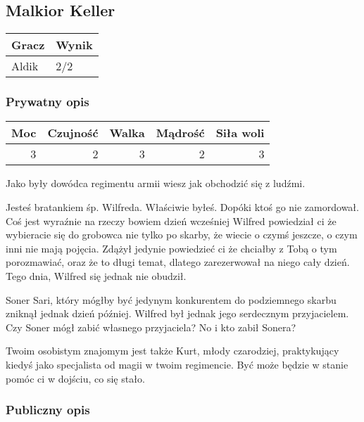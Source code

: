 \documentclass[11pt]{article}
\begin{document}
\subsection*{Malkior Keller}
\label{sec-3.2}


\begin{center}
\begin{tabular}{ll}
 Gracz  &  Wynik  \\
\hline
 Aldik  &  2/2    \\
\end{tabular}
\end{center}


\subsubsection*{Prywatny opis}
\label{sec-3.2.1}


\begin{center}
\begin{tabular}{rrrrr}
 Moc  &  Czujność  &  Walka  &  Mądrość  &  Siła woli  \\
\hline
   3  &         2  &      3  &        2  &          3  \\
\end{tabular}
\end{center}


    Jako były dowódca regimentu armii wiesz jak obchodzić się z
    ludźmi.
    
    Jesteś bratankiem śp. Wilfreda. Właściwie byłeś. Dopóki ktoś go
    nie zamordował. Coś jest wyraźnie na rzeczy bowiem dzień
    wcześniej Wilfred powiedział ci że wybieracie się do grobowca nie
    tylko po skarby, że wiecie o czymś jeszcze, o czym inni nie mają
    pojęcia. Zdążył jedynie powiedzieć ci że chciałby z Tobą o tym
    porozmawiać, oraz że to długi temat, dlatego zarezerwował na
    niego cały dzień. Tego dnia, Wilfred się jednak nie obudził.

    Soner Sari, który mógłby być jedynym konkurentem do podziemnego
    skarbu zniknął jednak dzień później. Wilfred był jednak
    jego serdecznym przyjacielem. Czy Soner mógł zabić własnego
    przyjaciela? No i kto zabił Sonera?

    Twoim osobistym znajomym jest także Kurt, młody czarodziej,
    praktykujący kiedyś jako specjalista od magii w twoim
    regimencie. Być może będzie w stanie pomóc ci w dojściu, co się
    stało.
\subsubsection*{Publiczny opis}
\label{sec-3.2.2}
\end{document}
